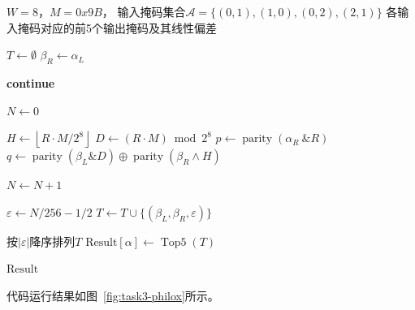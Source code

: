 \begin{algorithm}[H]
    \caption{PHILOX-2W一轮线性掩码传播分析}
    \label{alg:task3-philox}
    \begin{algorithmic}[1]
        \Require $W=8$，$M=0x9B$，
        输入掩码集合$\mathcal{A}=\{(0,1),(1,0),(0,2),(2,1)\}$
        \Ensure 各输入掩码对应的前5个输出掩码及其线性偏差

            \State $T\gets\emptyset$
            \State $\beta_R\gets\alpha_L$

                    \State \textbf{continue}
                \EndIf

                \State $N\gets 0$

                    \State $H\gets\left\lfloor R\cdot M/2^8\right\rfloor$
                    \State $D\gets(R\cdot M)\bmod 2^8$
                    \State $p\gets\operatorname{parity}(\alpha_R\ \& R)$
                    \State $q\gets\operatorname{parity}(\beta_L \& D)
                    \oplus\operatorname{parity}(\beta_R\land H)$

                        \State $N\gets N+1$
                    \EndIf
                \EndFor

                \State $\varepsilon\gets N/256-1/2$
                \State $T\gets T\cup\{(\beta_L,\beta_R,\varepsilon)\}$
            \EndFor

            \State 按$|\varepsilon|$降序排列$T$
            \State $\mathrm{Result}[\alpha]\gets\operatorname{Top5}(T)$
        \EndFor

        \State \Return $\mathrm{Result}$
    \end{algorithmic}
\end{algorithm}

代码运行结果如图~\ref{fig:task3-philox}所示。

